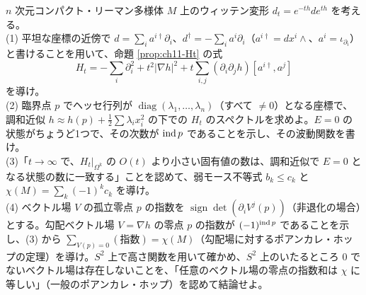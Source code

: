 \begin{problem}[難易度 D]\label{ch11-prob-witten}
$n$ 次元コンパクト・リーマン多様体 $M$ 上のウィッテン変形 $d_t=e^{-th}de^{th}$ を考える。\\
(1) 平坦な座標の近傍で $d=\sum_ia^{i\dagger}\partial_i$、$d^\dagger=-\sum_ia^i\partial_i$（$a^{i\dagger}=dx^i\wedge$、$a^i=\iota_{\partial_i}$）と書けることを用いて、命題 \ref{prop:ch11-Ht} の式
\[
H_t=-\sum_i\partial_i^2+t^2\lvert\nabla h\rvert^2+t\sum_{i,j}(\partial_i\partial_jh)[a^{i\dagger},a^j]
\]
を導け。\\
(2) 臨界点 $p$ でヘッセ行列が $\operatorname{diag}(\lambda_1,\dots,\lambda_n)$（すべて $\neq0$）となる座標で、調和近似 $h\approx h(p)+\tfrac12\sum\lambda_ix_i^2$ の下での $H_t$ のスペクトルを求めよ。$E=0$ の状態がちょうど1つで、その次数が $\operatorname{ind} p$ であることを示し、その波動関数を書け。\\
(3)「$t\to\infty$ で、$H_t|_{\Omega^k}$ の $O(t)$ より小さい固有値の数は、調和近似で $E=0$ となる状態の数に一致する」ことを認めて、弱モース不等式 $b_k\le c_k$ と $\chi(M)=\sum_k(-1)^kc_k$ を導け。\\
(4) ベクトル場 $V$ の孤立零点 $p$ の指数を $\operatorname{sign}\det(\partial_iV^j(p))$（非退化の場合）とする。勾配ベクトル場 $V=\nabla h$ の零点 $p$ の指数が $(-1)^{\operatorname{ind} p}$ であることを示し、(3) から $\sum_{V(p)=0}(\text{指数})=\chi(M)$（勾配場に対するポアンカレ・ホップの定理）を導け。$S^2$ 上で高さ関数を用いて確かめ、$S^2$ 上のいたるところ $0$ でないベクトル場は存在しないことを、「任意のベクトル場の零点の指数和は $\chi$ に等しい」（一般のポアンカレ・ホップ）を認めて結論せよ。
\end{problem}

